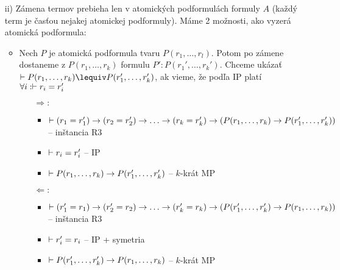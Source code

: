 \begin{dokaz}
\begin{itemize}
\begin{itemize}
        \end{itemize}
    \item[ii)] Zámena termov prebieha len v atomických podformulách
        formuly $A$ (každý term je časťou nejakej atomickej podformuly).
        Máme 2 možnosti, ako vyzerá atomická podformula:
        \begin{itemize}
        \item Nech $P$ je atomická podformula tvaru
            $P(r_1,\dots,r_l)$. Potom po zámene dostaneme z 
            $P(r_1, \dots, r_k)$ formulu $P':P(r_1',\dots,r_k')$.
            Chceme ukázať $\provable P(r_1,\dots,r_k) \lequiv
                                     P(r_1',\dots,r_k')$, ak vieme, že
            podľa IP platí $\forall i: \vdash r_i = r_i'$
            \begin{itemize}
            \item [$\Rightarrow:$] 
                \begin{itemize}
                \item $\provable (r_1=r_1') \implies
                                 (r_2=r_2') \implies \dots \implies
                                 (r_k=r_k') \implies
                                 (P(r_1,\dots,r_k) \implies
                                 P(r_1',\dots,r_k'))$ -- inštancia R3
                \item $\vdash r_i = r_i'$ -- IP
                \item $\vdash P(r_1,\dots,r_k) \rightarrow
                    P(r_1',\dots, r_k')$ -- $k$-krát MP
                \end{itemize}
            \item [$\Leftarrow:$]
                \begin{itemize}
                \item $\provable (r_1'=r_1) \implies
                                 (r_2'=r_2) \implies \dots \implies
                                 (r_k'=r_k) \implies
                                 (P(r_1',\dots,r_k') \implies
                                 P(r_1,\dots,r_k))$ -- inštancia R3
                \item $\vdash r_i' = r_i$ -- IP + symetria
                \item $\vdash P(r_1',\dots,r_k') \rightarrow
                    P(r_1,\dots, r_k)$ -- $k$-krát MP
                

\end{itemize}
\end{itemize}
\end{itemize}
\end{itemize}
\end{dokaz}
